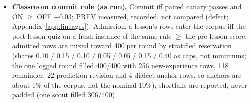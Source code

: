 \documentclass{article}
\begin{document}
\begin{itemize}
\item \textbf{Classroom commit rule (as run).} Commit iff paired canary passes and ON $\ge$ OFF $-0.03$; PREV measured, recorded, not compared (defect; Appendix~\ref{app:lineages}). Admission: a lesson's rows enter the corpus iff the post-lesson quiz on a fresh instance of the same rule $\ge$ the pre-lesson score; admitted rows are mixed toward 400 per round by stratified reservation (shares 0.10 / 0.15 / 0.10 / 0.05 / 0.05 / 0.15 / 0.40 as caps, not minimums; the one logged round filled 400/400 with 256 new-experience rows, 118 remainder, 22 prediction-revision and 4 dialect-anchor rows, so anchors are about 1\% of the corpus, not the nominal 10\%); shortfalls are reported, never padded (one scout filled 306/400).
\end{itemize}

\end{document}
